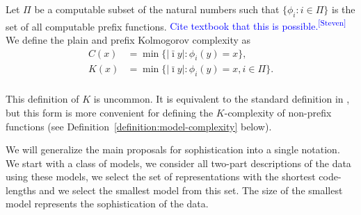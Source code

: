\documentclass{style/llncs}
\newcommand{\sdr}[1]{\textcolor{blue}{\small #1\textsuperscript{[Steven]} }}
\begin{document}
\begin{definition}[Complexity]\belowdisplayskip=-12pt
Let $\Pi$ be a computable subset of the natural numbers such that  $\{\phi_i:i\in\Pi\}$ is the set of all computable prefix functions. \sdr{Cite textbook that this is possible.} We define the plain and prefix Kolmogorov complexity as 
\begin{align*}
C(x)&=\min\{|\bar\imath y|:\phi_i(y)=x\},\\
K(x)&=\min\{|\bar\imath y|:\phi_i(y)=x, i\in\Pi\}.\\
\end{align*}\label{definition:complexity}\vspace{-18pt}
\end{definition}
This definition of $K$ is uncommon. It is equivalent to the standard definition in \cite{li1993introduction}, but this form is more convenient for defining the $K$-complexity of non-prefix functions (see Definition~\ref{definition:model-complexity} below).

We will generalize the main proposals for sophistication into a single notation. We start with a class of models, we consider all two-part descriptions of the data using these models, we select the set of representations with the shortest code-lengths and we select the smallest model from this set. The size of the smallest model represents the sophistication of the data.
\end{document}
